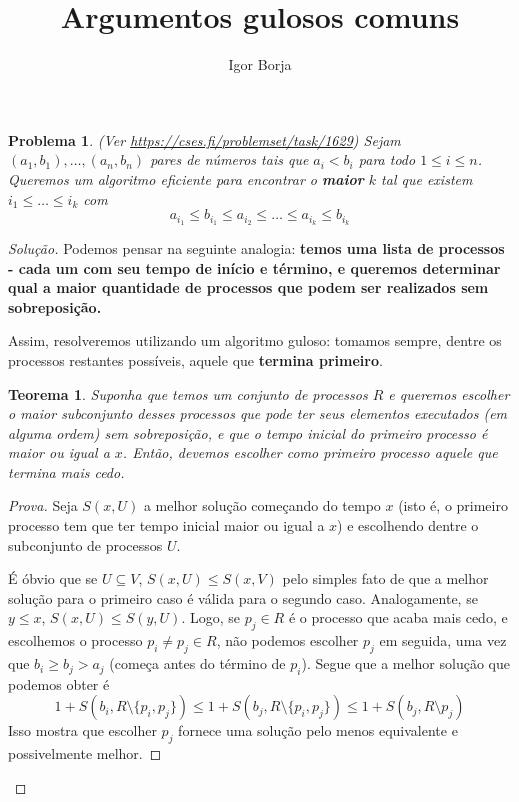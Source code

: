 \documentclass{article}
\title{Argumentos gulosos comuns}
\author{Igor Borja}
\newtheorem{theorem}{Teorema}[section] %
\newtheorem{problem}{Problema}
\newenvironment{proofenv}{\begin{adjustwidth}{0.25cm}{0.25cm}\begin{proof}[Prova]}{\end{proof}\end{adjustwidth}}
\newenvironment{solutionenv}{\begin{adjustwidth}{0.25cm}{0.25cm}\begin{proof}[Solução]}{\end{proof}\end{adjustwidth}}
\begin{document}
\maketitle
\begin{problem} (Ver \url{https://cses.fi/problemset/task/1629})
  Sejam \((a_{1}, b_{1}), \dotsc, (a_{n}, b_{n})\) pares de números tais que \(a_{i} < b_{i}\) para todo \(1 \leq i \leq n\). Queremos um algoritmo eficiente para encontrar o \textbf{maior} \(k\) tal que existem \(i_{1} \leq \dotsc \leq i_{k}\) com
  \[a_{i_{1}} \leq b_{i_{1}} \leq a_{i_{2}} \leq \dotsc \leq a_{i_{k}} \leq b_{i_{k}}\]
\end{problem}
\begin{solutionenv}
  Podemos pensar na seguinte analogia: \textbf{temos uma lista de processos - cada um com seu tempo de início e término, e queremos determinar qual a maior quantidade de processos que podem ser realizados sem sobreposição.}

  Assim, resolveremos utilizando um algoritmo guloso: tomamos sempre, dentre os processos restantes possíveis, aquele que \textbf{termina primeiro}.

  \begin{theorem}
    Suponha que temos um conjunto de processos \(R\) e queremos escolher o maior subconjunto desses processos que pode ter seus elementos executados (em alguma ordem) sem sobreposição, e que o tempo inicial do primeiro processo é maior ou igual a \(x\). Então, devemos escolher como primeiro processo aquele que termina mais cedo.
  \end{theorem}
  \begin{proofenv}
    Seja \(S(x, U)\) a melhor solução começando do tempo \(x\) (isto é, o primeiro processo tem que ter tempo inicial maior ou igual a \(x\)) e escolhendo dentre o subconjunto de processos \(U\).

    É óbvio que se \(U \subseteq V\), \(S(x, U) \leq S(x, V)\) pelo simples fato de que a melhor solução para o primeiro caso é válida para o segundo caso. Analogamente, se \(y \leq x\), \(S(x, U) \leq S(y, U)\). Logo, se \(p_{j} \in R\) é o processo que acaba mais cedo, e escolhemos o processo \(p_{i} \neq p_{j} \in R\), não podemos escolher \(p_{j}\) em seguida, uma vez que \(b_{i} \geq b_{j} > a_{j}\) (começa antes do término de \(p_{i}\)). Segue que a melhor solução que podemos obter é
    \[1 + S(b_{i}, R \setminus \{p_{i}, p_{j}\}) \leq 1 + S(b_{j}, R\setminus\{p_{i}, p_{j}\}) \leq 1 + S(b_{j}, R \setminus{p_{j}})\]
    Isso mostra que escolher \(p_{j}\) fornece uma solução pelo menos equivalente e possivelmente melhor.
  \end{proofenv}
\end{solutionenv}
\end{document}
